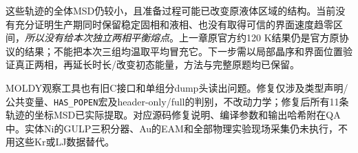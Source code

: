 这些轨迹的全体MSD仍较小，且准备过程可能已改变原液体区域的结构。当前没有充分证明生产期同时保留稳定固相和液相、也没有取得可信的界面速度趋零区间，\emph{所以没有给本次独立两相平衡熔点}。上一章原官方约120 K结果仍是官方原协议的结果；不能把本次三组均温取平均冒充它。下一步需以局部晶序和界面位置验证真正两相，再延长时长/改变初态能量，方法与完整原题均已保留。

MOLDY观察工具也有旧C接口和单组分dump头读出问题。修复仅涉及类型声明/公共变量、\texttt{HAS\_POPEN}宏及header-only/full的判别，不改动力学；修复后所有11条轨迹的坐标MSD已实际提取。对应源码修复说明、编译参数和输出哈希附在QA中。实体Ni的GULP三积分器、Au的EAM和全部物理实验现场采集仍未执行，不用这些Kr或LJ数据替代。
